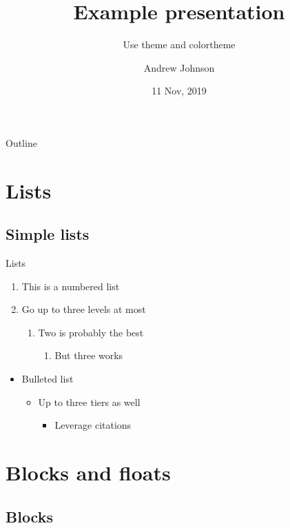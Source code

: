 \documentclass{beamer}
\title{Example presentation}
\subtitle{Use theme and colortheme}
\author{Andrew Johnson}
\institute[Georgia Tech]{Georgia Institute of Technology}
\date{11 Nov, 2019}
\begin{document}
\frame{\titlepage}

\begin{frame}{Outline}
    \tableofcontents
\end{frame}

\section{Lists}

\frame{\sectionpage}

\subsection{Simple lists}

\begin{frame}{Lists}
    \begin{enumerate}
        \item{This is a numbered list}
        \item{Go up to three levels at most}
            \begin{enumerate}
                \item{Two is probably the best}
                    \begin{enumerate}
                        \item{But three works}
                    \end{enumerate}
            \end{enumerate}
    \end{enumerate}
    \begin{itemize}
        \item{Bulleted list}
            \begin{itemize}
                \item{Up to three tiers as well}
                    \begin{itemize}
                        \item{Leverage citations \cite{burdell_1999}}
                    \end{itemize}
            \end{itemize}
    \end{itemize}
\end{frame}

\section{Blocks and floats}

\subsection{Blocks}
\end{document}
